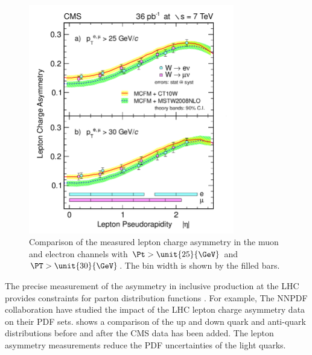 \begin{figure}[htbp]
  \begin{center}
  \includegraphics*[width=0.8\textwidth]{combined}
  \caption[Comparison of the measured lepton charge asymmetry in the muon and
electron channels] { Comparison of the measured lepton charge asymmetry in the
muon and electron channels with $\Pt>\unit{25}{\GeV}$ and $\PT>\unit{30}{\GeV}$.
The bin width is shown by the filled bars\cite{asym36}.}
  \label{fig:combined}
  \end{center}
\end{figure}

The precise measurement of the asymmetry in inclusive \PW production at the LHC
provides constraints for parton distribution functions \cite{asym840}.
For example, The NNPDF collaboration \cite{Lionetti:2011pw} have studied the
impact of the LHC \PW lepton charge asymmetry data on their PDF
sets\cite{Ball:2011gg}.  shows a comparison of the up and
down quark and anti-quark distributions before and after the CMS data has been
added\cite{Ball:2011gg}.  The lepton asymmetry measurements reduce the PDF
uncertainties of the light quarks.

